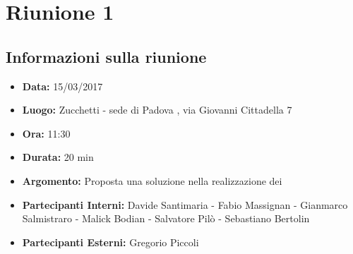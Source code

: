 	\section{Riunione 1}
	  \subsection{Informazioni sulla riunione}
	    \begin{itemize}
	      \item \textbf{Data: } 15/03/2017
	      \item \textbf{Luogo: } Zucchetti - sede di Padova , via Giovanni Cittadella 7
	      \item \textbf{Ora: } 11:30
	      \item \textbf{Durata: } 20 min
	      \item \textbf{Argomento: } Proposta una soluzione nella realizzazione dei 
	      \item \textbf{Partecipanti Interni: } Davide Santimaria - Fabio Massignan - Gianmarco Salmistraro - Malick Bodian - Salvatore Pilò - Sebastiano Bertolin
	      \item \textbf{Partecipanti Esterni: } Gregorio Piccoli
	    \end{itemize}
	    

